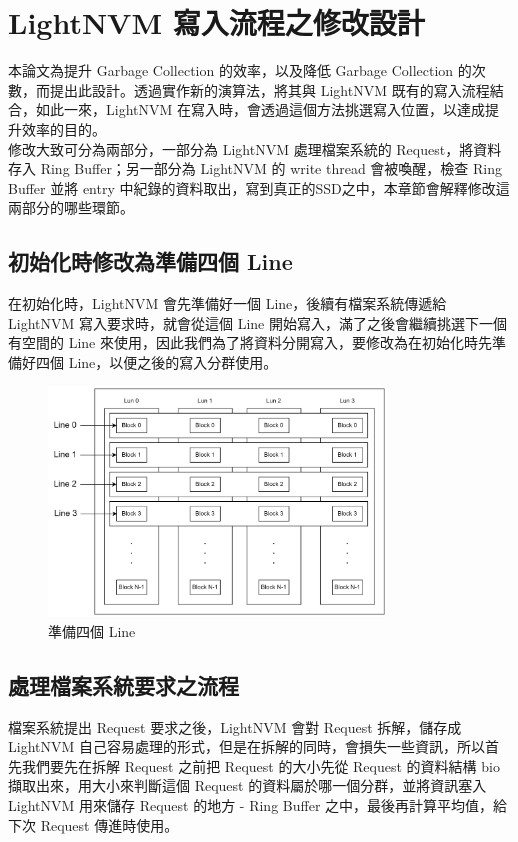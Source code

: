 \chapter{LightNVM 寫入流程之修改設計}
\indent
本論文為提升 Garbage Collection 的效率，以及降低 Garbage Collection 的次數，而提出此設計。透過實作新的演算法，將其與 LightNVM 既有的寫入流程結合，如此一來，LightNVM 在寫入時，會透過這個方法挑選寫入位置，以達成提升效率的目的。\\
\indent
修改大致可分為兩部分，一部分為 LightNVM 處理檔案系統的 Request，將資料存入 Ring Buffer；另一部分為 LightNVM 的 write thread 會被喚醒，檢查 Ring Buffer 並將 entry 中紀錄的資料取出，寫到真正的SSD之中，本章節會解釋修改這兩部分的哪些環節。

\section{初始化時修改為準備四個 Line}\label{s3.1}
\indent
在初始化時，LightNVM 會先準備好一個 Line，後續有檔案系統傳遞給 LightNVM 寫入要求時，就會從這個 Line 開始寫入，滿了之後會繼續挑選下一個有空間的 Line 來使用，因此我們為了將資料分開寫入，要修改為在初始化時先準備好四個 Line，以便之後的寫入分群使用。

\begin{figure}[H]
    \centering
    \includegraphics[width=0.8\textwidth]{picture/ch3/4Line.png}
    \caption{準備四個 Line}
    \label{f3.1}
\end{figure}

\section{處理檔案系統要求之流程}\label{s3.2}
\indent
檔案系統提出 Request 要求之後，LightNVM 會對 Request 拆解，儲存成 LightNVM 自己容易處理的形式，但是在拆解的同時，會損失一些資訊，所以首先我們要先在拆解 Request 之前把 Request 的大小先從 Request 的資料結構 bio 擷取出來，用大小來判斷這個 Request 的資料屬於哪一個分群，並將資訊塞入 LightNVM 用來儲存 Request 的地方 - Ring Buffer 之中，最後再計算平均值，給下次 Request 傳進時使用。


